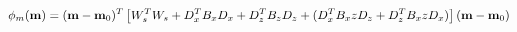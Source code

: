 \vspace{-0.1cm}
\begin{equation}
    \phi_m(\mathbf{m}) = (\mathbf{m} - \mathbf{m}_0)^T \left[ W_s^T W_s + D_x^T B_x D_x + D_z^T B_z D_z + \\ (D_x^T B_xz D_z + D_z^T B_xz D_x)\right] (\mathbf{m} - \mathbf{m}_0)
    \label{eq:discrete_rotation_expanded}
    \vspace{-0.05cm}
\end{equation}